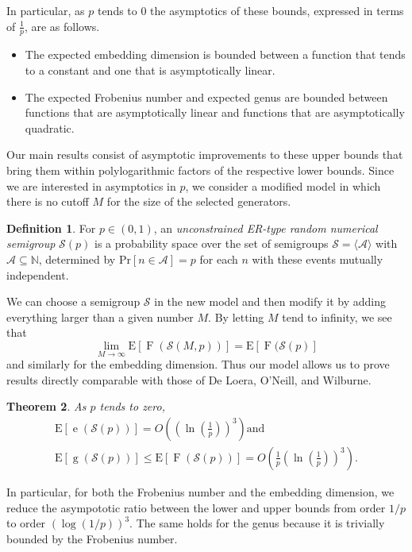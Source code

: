 \documentclass[11pt]{amsart}
\newtheorem{theorem}{Theorem}[section]
\theoremstyle{definition}
\newtheorem{definition}[theorem]{Definition}
\theoremstyle{remark}
\def\NN{\ensuremath{\mathbb{N}}}
\def\cA{\ensuremath{\mathcal{A}}}
\def\Pr{\ensuremath{\mathrm{Pr}}}
\def\EE{\ensuremath{\mathrm{E}}}
\def\nsg{\ensuremath{\mathcal{S}}}
\DeclareMathOperator\F{F}
\DeclareMathOperator\g{g}
\DeclareMathOperator\e{e}
\begin{document}
In particular, as $p$ tends to 0 the asymptotics of these bounds, expressed in terms of $\frac{1}{p}$, are as follows.
\begin{itemize}
\item The expected embedding dimension is bounded between a function that tends to a constant and one that is asymptotically linear. 
\item The expected Frobenius number and expected genus are bounded between functions that are asymptotically linear and functions that are asymptotically quadratic. 
\end{itemize}

Our main results consist of asymptotic improvements to these upper bounds that bring them within polylogarithmic factors of the respective lower bounds. Since we are interested in asymptotics in $p$, we consider a modified model in which there is no cutoff $M$ for the size of the selected generators.

\begin{definition} 
    For $p \in (0, 1)$, an \emph{unconstrained ER-type random numerical semigroup} $\nsg(p)$ is a probability space over the set of semigroups $\nsg = \langle\cA\rangle$ with $\cA \subseteq \NN$, determined by $\Pr[n \in \cA] = p$ for each $n$ with these events mutually independent.
\end{definition}

We can choose a semigroup $\nsg$ in the new model and then modify it by adding everything larger than a given number $M$. By letting $M$ tend to infinity, we see that 
\[ \lim_{M \to \infty} \EE[\F(\nsg(M,p))] = \EE[\F(\nsg(p)] \]
and similarly for the embedding dimension. Thus our model allows us to prove results directly comparable with those of De Loera, O'Neill, and Wilburne.

\begin{theorem} \label{thm:main}
As $p$ tends to zero,  
    \begin{align*}
      \EE[\e(\nsg(p))] = O\left( \left( \ln \left( \frac{1}{p} \right) \right)^3 \right) \text{and}  \\
       \EE[\g(\nsg(p))] \leq \EE[\F(\nsg(p))] = O \left( \frac{1}{p} \left( \ln \left( \frac{1}{p} \right) \right)^3 \right).
    \end{align*}
\end{theorem}

In particular, for both the Frobenius number and the embedding dimension, we reduce the asympototic ratio between the lower and upper bounds from order $1/p$ to order $\left(\log(1/p)\right)^3$. The same holds for the genus because it is trivially bounded by the Frobenius number.  
\end{document}

